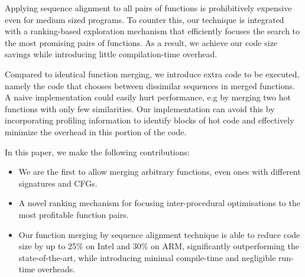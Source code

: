Applying sequence alignment to all pairs of functions is prohibitively expensive even for medium sized programs.
To counter this, our technique is integrated with a ranking-based exploration mechanism that efficiently focuses the search to the most
promising pairs of functions. %
As a result, we achieve our code size savings while introducing little compilation-time
overhead.

Compared to identical function merging, we introduce extra code to be executed,
namely the code that chooses between dissimilar sequences in merged functions.
A naive implementation could easily hurt performance, e.g by merging two hot functions
with only few similarities. Our implementation can avoid this by incorporating
profiling information to identify blocks of hot code and effectively minimize 
the overhead in this portion of the code.

In this paper, we make the following contributions:
\begin{itemize}
  \item We are the first to allow merging arbitrary functions, even ones with
    different signatures and CFGs.
  \item A novel ranking mechanism for focusing inter-procedural optimisations
    to the most profitable function pairs.
  \item Our function merging by sequence alignment technique is able to reduce
     code size by up to 25\% on Intel and 30\% on ARM, significantly outperforming the
    state-of-the-art, while introducing minimal compile-time and negligible run-time overheads.
\end{itemize}